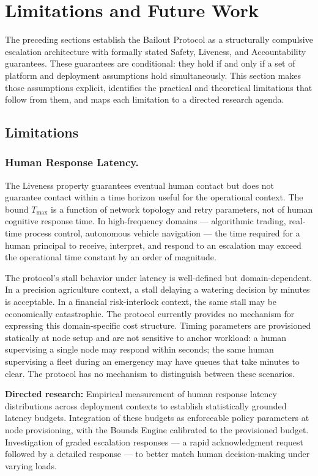\section{Limitations and Future Work}\label{sec:limitations}

The preceding sections establish the Bailout Protocol as a structurally compulsive escalation architecture with formally stated Safety, Liveness, and Accountability guarantees. These guarantees are conditional: they hold if and only if a set of platform and deployment assumptions hold simultaneously. This section makes those assumptions explicit, identifies the practical and theoretical limitations that follow from them, and maps each limitation to a directed research agenda.

\subsection{Limitations}

\subsubsection{Human Response Latency.}
The Liveness property guarantees eventual human contact but does not guarantee contact within a time horizon useful for the operational context. The bound $T_{\max}$ is a function of network topology and retry parameters, not of human cognitive response time. In high-frequency domains — algorithmic trading, real-time process control, autonomous vehicle navigation — the time required for a human principal to receive, interpret, and respond to an escalation may exceed the operational time constant by an order of magnitude.

The protocol's stall behavior under latency is well-defined but domain-dependent. In a precision agriculture context, a stall delaying a watering decision by minutes is acceptable. In a financial risk-interlock context, the same stall may be economically catastrophic. The protocol currently provides no mechanism for expressing this domain-specific cost structure. Timing parameters are provisioned statically at node setup and are not sensitive to anchor workload: a human supervising a single node may respond within seconds; the same human supervising a fleet during an emergency may have queues that take minutes to clear. The protocol has no mechanism to distinguish between these scenarios.

\textbf{Directed research:} Empirical measurement of human response latency distributions across deployment contexts to establish statistically grounded latency budgets. Integration of these budgets as enforceable policy parameters at node provisioning, with the Bounds Engine calibrated to the provisioned budget. Investigation of graded escalation responses — a rapid acknowledgment request followed by a detailed response — to better match human decision-making under varying loads.

